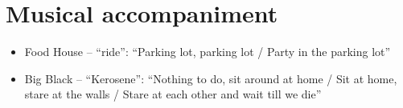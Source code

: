 \documentclass[oneside, a5paper]{book}
\begin{document}
\section*{Musical accompaniment}
\begin{itemize}
    \item Food House -- ``ride'': ``Parking lot, parking lot / Party in the parking lot''
    \item Big Black -- ``Kerosene'': ``Nothing to do, sit around at home / Sit at home, stare at the walls / Stare at each other and wait till we die''
\end{itemize}
\end{document}
